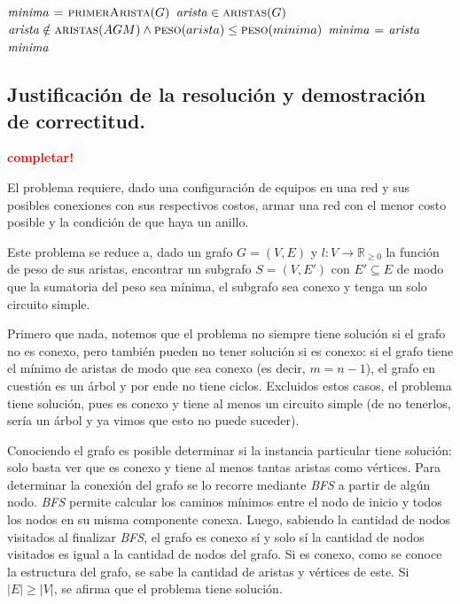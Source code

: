\begin{codebox}
\li $\id{minima} \gets \proc{primerArista}(G)$
\li \For $\id{arista} \in \proc{aristas}(G)$
      \Do
\li     \If $\id{arista} \notin \proc{aristas}(AGM) \land
            \proc{peso}(arista) \leq \proc{peso}(minima)$
            \Do
\li            $\id{minima} \gets \id{arista}$
            \End
      \End
\li \Return $\id{minima}$
\end{codebox}


\newpage
\subsection{Justificación de la resolución y demostración de correctitud.}

\vspace*{0.3cm}

\textcolor{red}{\textbf{completar!}}

El problema requiere, dado una configuración de equipos en una red y sus
posibles conexiones con sus respectivos costos, armar una red con el menor
costo posible y la condición de que haya un anillo.

Este problema se reduce a, dado un grafo $G = (V, E)$ y $l: V \to
\mathbb{R}_{\geq 0}$ la función de peso de sus aristas, encontrar un
subgrafo $S = (V, E')$ con $E' \subseteq E$ de modo que la sumatoria del
peso sea mínima, el subgrafo sea conexo y tenga un solo circuito simple.

Primero que nada, notemos que el problema no siempre tiene solución si el
grafo no es conexo, pero también pueden no tener solución si es conexo: si
el grafo tiene el mínimo de aristas de modo que sea conexo (es decir, $m = n
- 1$), el grafo en cuestión es un árbol y por ende no tiene ciclos.
Excluidos estos casos, el problema tiene solución, pues es conexo y tiene al
menos un circuito simple (de no tenerlos, sería un árbol y ya vimos que esto
no puede suceder).

Conociendo el grafo es posible determinar si la instancia particular tiene
solución: solo basta ver que es conexo y tiene al menos tantas aristas como
vértices. Para determinar la conexión del grafo se lo recorre mediante
\textit{BFS} a partir de algún nodo. \textit{BFS} permite calcular los
caminos mínimos entre el nodo de inicio y todos los nodos en su misma
componente conexa. Luego, sabiendo la cantidad de nodos visitados al
finalizar \textit{BFS}, el grafo es conexo sí y solo sí la cantidad de nodos
visitados es igual a la cantidad de nodos del grafo. Si es conexo, como se
conoce la estructura del grafo, se sabe la cantidad de aristas y vértices de
este. Si $|E| \geq |V|$, se afirma que el problema tiene solución.

